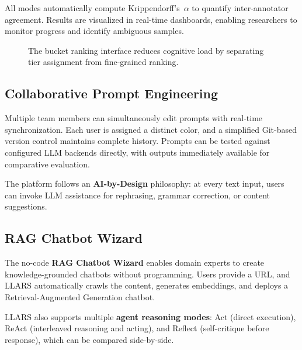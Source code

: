 \documentclass{article}
\begin{document}
All modes automatically compute Krippendorff's~$\alpha$ \cite{krippendorff2011computing} to quantify inter-annotator agreement.
Results are visualized in real-time dashboards, enabling researchers to monitor progress and identify ambiguous samples.

\begin{figure}[t]
\centering
{}
\caption{The bucket ranking interface reduces cognitive load by separating tier assignment from fine-grained ranking.}
\label{fig:bucket-ranking}
\end{figure}

\subsection{Collaborative Prompt Engineering}

Multiple team members can simultaneously edit prompts with real-time synchronization.
Each user is assigned a distinct color, and a simplified Git-based version control maintains complete history.
Prompts can be tested against configured LLM backends directly, with outputs immediately available for comparative evaluation.

The platform follows an \textbf{AI-by-Design} philosophy: at every text input, users can invoke LLM assistance for rephrasing, grammar correction, or content suggestions.

\subsection{RAG Chatbot Wizard}

The no-code \textbf{RAG Chatbot Wizard} enables domain experts to create knowledge-grounded chatbots without programming.
Users provide a URL, and LLARS automatically crawls the content, generates embeddings, and deploys a Retrieval-Augmented Generation chatbot.

LLARS also supports multiple \textbf{agent reasoning modes}: Act (direct execution), ReAct \cite{yao2023react} (interleaved reasoning and acting), and Reflect (self-critique before response), which can be compared side-by-side.

\end{document}
